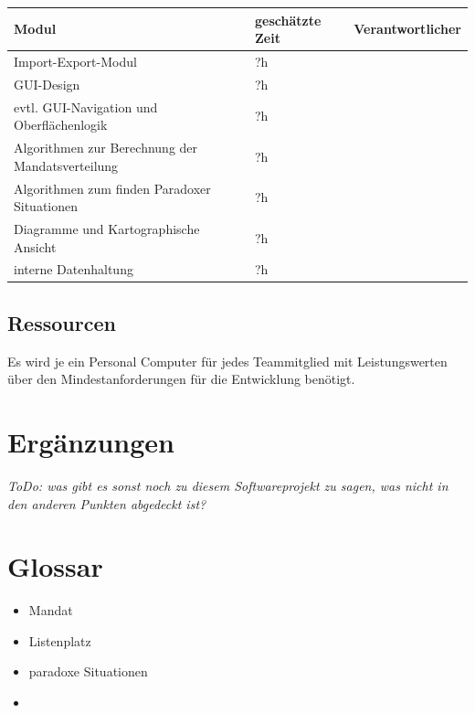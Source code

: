 \documentclass[10pt,a4paper]{article}
\begin{document}
\begin{tabular}[h]{lll}
	\hline
	\textbf{Modul} & \textbf{geschätzte Zeit} & \textbf{Verantwortlicher} \\
	\hline
	Import-Export-Modul & ?h &  \\
	GUI-Design & ?h &  \\
	evtl. GUI-Navigation und Oberflächenlogik & ?h &  \\
	Algorithmen zur Berechnung der Mandatsverteilung & ?h &  \\
	Algorithmen zum finden Paradoxer Situationen  & ?h &  \\
	Diagramme und Kartographische Ansicht  & ?h &  \\
	interne Datenhaltung  & ?h &  \\
	\hline
\end{tabular}

\subsection{Ressourcen}
Es wird je ein Personal Computer für jedes Teammitglied mit Leistungswerten über den Mindestanforderungen für die Entwicklung benötigt.


\section{Ergänzungen}
\textit{ToDo: was gibt es sonst noch zu diesem Softwareprojekt zu sagen, was nicht in den anderen Punkten abgedeckt ist?}

\section{Glossar}
\begin{itemize}
	\item Mandat
	\item Listenplatz
	\item paradoxe Situationen
	\item 
\end{itemize}
\end{document}
